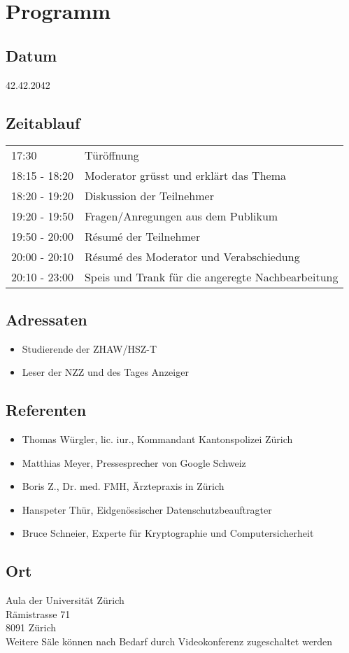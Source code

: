\section{Programm}
\subsection*{Datum}
42.42.2042

\subsection*{Zeitablauf}
\begin{tabular}{ll}
17:30	& Türöffnung\\
18:15 - 18:20 & Moderator grüsst und erklärt das Thema\\
18:20 - 19:20 & Diskussion der Teilnehmer\\
19:20 - 19:50 & Fragen/Anregungen aus dem Publikum\\
19:50 - 20:00 & Résumé der Teilnehmer\\ %
20:00 - 20:10 & Résumé des Moderator und Verabschiedung\\ %
20:10 - 23:00 & Speis und Trank für die angeregte Nachbearbeitung\\
\end{tabular}

\subsection*{Adressaten}
\begin{itemize}
 \item Studierende der ZHAW/HSZ-T
 \item Leser der NZZ und des Tages Anzeiger
\end{itemize}


\subsection*{Referenten}
\begin{itemize}
\item Thomas Würgler, lic. iur., Kommandant Kantonspolizei Zürich
\item Matthias Meyer, Pressesprecher von Google Schweiz
\item Boris Z., Dr. med. FMH, Ärztepraxis in Zürich
\item Hanspeter Thür, Eidgenössischer Datenschutzbeauftragter
\item Bruce Schneier, Experte für Kryptographie und Computersicherheit
\end{itemize}

\subsection*{Ort}
Aula der Universität Zürich\\
Rämistrasse 71\\
8091 Zürich \\
\newline
Weitere Säle können nach Bedarf durch Videokonferenz zugeschaltet werden
